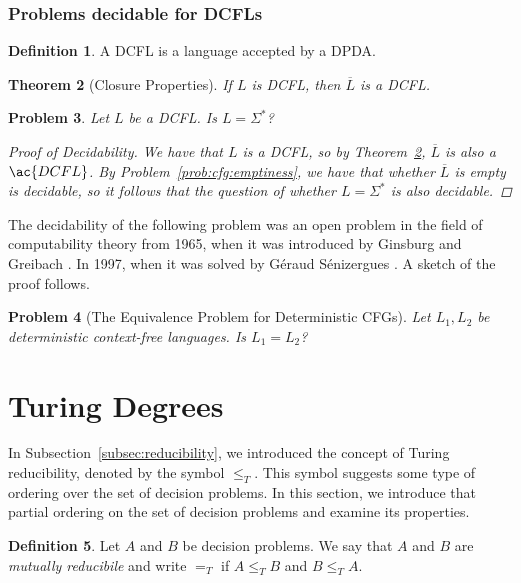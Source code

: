\documentclass[psamsfonts]{amsart}
\newtheorem{thm}{Theorem}[section]
\newtheorem{prob}[thm]{Problem}
\theoremstyle{definition}
\newtheorem{defn}[thm]{Definition}
\theoremstyle{remark}
\numberwithin{equation}{section}
\begin{document}
\subsubsection{Problems decidable for DCFLs}
\cite{ginsburg65:_deter}
\begin{defn}
  A \ac{DCFL} is a language accepted by a
  \acl{DPDA}.
\end{defn}

\begin{thm}[Closure Properties]
  \label{dcfl:complement}
  If $L$ is \ac{DCFL}, then $\overline{L}$ is a
  \ac{DCFL}. \todo{}
\end{thm}

\begin{prob}
  Let $L$ be a \ac{DCFL}. Is $L = \Sigma^*$?
  \begin{proof}[Proof of Decidability]
    We have that $L$ is a \ac{DCFL}, so by Theorem~\ref{dcfl:complement},
    $\overline{L}$ is also a $\ac{DCFL}$. By Problem~\ref{prob:cfg:emptiness},
    we have that whether $\overline{L}$ is empty is decidable, so it follows
    that the question of whether $L = \Sigma^*$ is also decidable.
  \end{proof}
\end{prob}

The decidability of the following problem was an open problem in the field of
computability theory from 1965, when it was introduced by Ginsburg and Greibach \cite{ginsburg65:_deter}. In 1997, when it was solved by G\'eraud S\'enizergues
\cite{senizergues_det_pd_decid}. A sketch of the proof follows. 

\begin{prob}[The Equivalence Problem for Deterministic CFGs]
  Let $L_1,L_2$ be deterministic context-free languages. Is $L_1=L_2$?
\todo{}
\end{prob}

\section{Turing Degrees}
In Subsection~\ref{subsec:reducibility}, we introduced the concept of
Turing reducibility, denoted by the symbol $\leq_T$. This symbol suggests some type of
ordering over the set of decision problems. In this section, we introduce that
partial ordering on the set of decision problems and examine its properties.

\begin{defn}
  Let $A$ and $B$ be decision problems. We say that $A$ and $B$ are
  \emph{mutually reducibile} and write $=_T$ if $A \leq_T B$ and $B \leq_T A$.
\end{defn}
\end{document}
